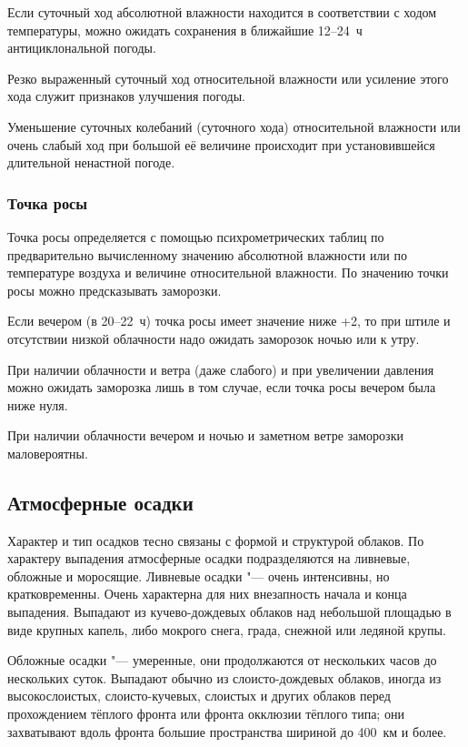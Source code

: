  Если суточный ход абсолютной влажности находится в
соответствии с ходом температуры, можно ожидать сохранения в ближайшие
12--24~ч антициклональной погоды.

 Резко выраженный суточный ход относительной влажности или
усиление этого хода служит признаков улучшения погоды.

 Уменьшение суточных колебаний (суточного хода) относительной
влажности или очень слабый ход при большой её величине происходит при
установившейся длительной ненастной погоде.

\subsubsection{Точка росы}

Точка росы определяется с помощью психрометрических таблиц по
предварительно вычисленному значению абсолютной влажности или по
температуре воздуха и величине относительной влажности. По значению
точки росы можно предсказывать заморозки.

 Если вечером (в 20--22~ч) точка росы имеет значение ниже +2\grC, то
при штиле и отсутствии низкой облачности надо ожидать заморозок ночью
или к утру.

 При наличии облачности и ветра (даже слабого) и при увеличении
давления можно ожидать заморозка лишь в том случае, если точка росы
вечером была ниже нуля.

 При наличии облачности вечером и ночью и заметном ветре
заморозки маловероятны.

\subsection{Атмосферные осадки}

Характер и тип осадков тесно связаны с формой и структурой облаков. По
характеру выпадения атмосферные осадки подразделяются на ливневые,
обложные и моросящие. Ливневые осадки "--- очень интенсивны, но
кратковременны. Очень характерна для них внезапность начала и конца
выпадения. Выпадают из кучево-дождевых облаков над небольшой площадью
в виде крупных капель, либо мокрого снега, града, снежной или ледяной
крупы.

Обложные осадки "--- умеренные, они продолжаются от нескольких часов до
нескольких суток. Выпадают обычно из слоисто-дождевых облаков, иногда
из высокослоистых, слоисто-кучевых, слоистых и других облаков перед
прохождением тёплого фронта или фронта окклюзии тёплого типа; они
захватывают вдоль фронта большие пространства шириной до 400~км и
более.

